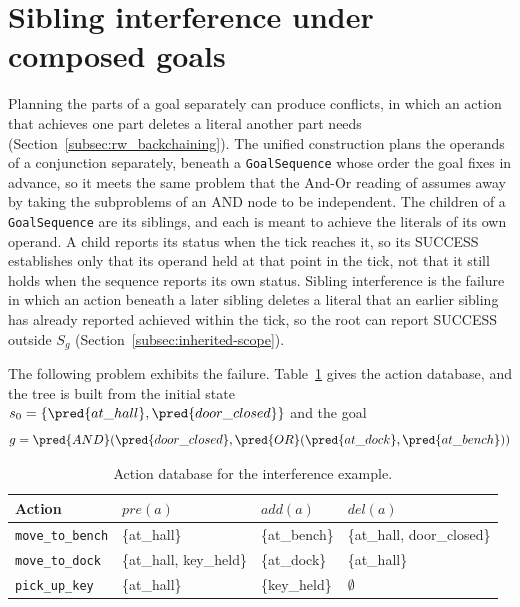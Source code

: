 \section{Sibling interference under composed goals}
\label{sec:interference}
    Planning the parts of a goal separately can produce conflicts, in which an action that achieves one part deletes a literal another part needs (Section~\ref{subsec:rw_backchaining}).
    The unified construction plans the operands of a conjunction separately, beneath a \texttt{GoalSequence} whose order the goal fixes in advance, so it meets the same problem that the And-Or reading of \cite{colledanchise2016tr} assumes away by taking the subproblems of an AND node to be independent.
    The children of a \texttt{GoalSequence} are its siblings, and each is meant to achieve the literals of its own operand.
    A child reports its status when the tick reaches it, so its SUCCESS establishes only that its operand held at that point in the tick, not that it still holds when the sequence reports its own status.
    Sibling interference is the failure in which an action beneath a later sibling deletes a literal that an earlier sibling has already reported achieved within the tick, so the root can report SUCCESS outside $S_g$ (Section~\ref{subsec:inherited-scope}).

    The following problem exhibits the failure.
    Table~\ref{tab:interference-actions} gives the action database, and the tree is built from the initial state $s_0 = \{\pred{at\_hall}, \pred{door\_closed}\}$ and the goal
    \begin{equation}
      g = \pred{AND}(\pred{door\_closed}, \pred{OR}(\pred{at\_dock}, \pred{at\_bench}))
      \label{eq:interference-goal}
    \end{equation}

    \begin{table}[htbp]
      \centering
      \caption{Action database for the interference example.}
      \label{tab:interference-actions}
      \begin{tabular}{llll}
        \toprule
        Action & $pre(a)$ & $add(a)$ & $del(a)$ \\
        \midrule
        \texttt{move\_to\_bench} & \{at\_hall\}            & \{at\_bench\} & \{at\_hall, door\_closed\} \\
        \texttt{move\_to\_dock}  & \{at\_hall, key\_held\} & \{at\_dock\}  & \{at\_hall\} \\
        \texttt{pick\_up\_key}   & \{at\_hall\}            & \{key\_held\} & $\emptyset$ \\
        \bottomrule
      \end{tabular}
    \end{table}

